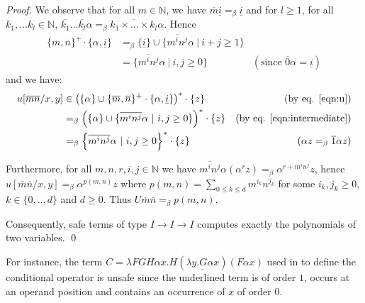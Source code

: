 \documentclass{llncs}
\newcommand{\encode}[1]{\overline{#1}}
\newcommand\union{\cup}
\newcommand\nat{\mathbb{N}}
\begin{document}
\begin{proof}
We observe that for all $m \in \nat$, we have $\encode{m} \underline{i} =_\beta \underline{i}$ and for $l\geq 1$, for all $k_1, \ldots k_l \in \nat$, 
$\encode{k_1}\ldots \encode{k_l} \alpha =_\beta
\encode{k_1\times \ldots \times k_l} \alpha$. Hence
\begin{align}
\{\encode{m},\encode{n}\}^+ \cdot \{\alpha, \underline{i} \} &=_\beta
\{ \underline{i} \} \union
\{ \encode{m^i n^j} \alpha \ |\ i+j \geq 1 \} \nonumber \\
&= \{ \encode{m^i n^j} \alpha \ |\ i,j \geq 0 \} & ( \mbox{since } \encode{0} \alpha = \underline{i}) \label{eqn:intermediate}
\end{align}
and we have:
\begin{align*}
u[\encode{m} \encode{n}/x,y] &\in \left( \{ \alpha \} \union \{\encode{m},\encode{n}\}^+ \cdot \{\alpha, \underline{i} \} \right)^* \cdot \{ z \}  & \mbox{(by eq. \ref{eqn:u})} \\
&=_\beta \left( \{\alpha \} \union \{ \encode{m^i n^j}
\alpha \ | \ i,j \geq 0 \} \right)^* \cdot \{ z \} & \mbox{(by eq. \ref{eqn:intermediate})}  \\
&=_\beta \left\{ \encode{m^i n^j}
\alpha \ | \ i,j \geq 0 \right\}^* \cdot \{ z \} & \mbox{($\alpha z =_\beta \encode{1} \alpha z$)}
\end{align*} 

Furthermore, for all $m,n,r,i,j\in \nat$ 
we have $\encode{m^i n^j} \alpha (\alpha^r z) =_\beta
\alpha^{r + m^i n^j} z$,
hence $u[\encode{m} \encode{n}/x,y] =_\beta \alpha^{p(m,n)} z$ where $p(m,n) = \sum_{0\leq k \leq d} m^{i_k} n^{j_k}$ for some $i_k,j_k \geq 0$, $k \in\{ 0,..,d \}$ and $d\geq 0$.
Thus $U \encode{m} \encode{n} =_\beta \encode{p(m,n)}$. 

Consequently, safe terms of type $I \rightarrow I \rightarrow I$ computes
exactly the polynomials of two variables. \qed
\end{proof}

For instance, the term $ C = \lambda F G H \alpha x . H ( \underline{\lambda y . G \alpha x} ) (F \alpha x)$ used in \cite{citeulike:622637} to define the conditional operator is
unsafe since the underlined term is of order $1$, occurs at an operand position and contains an occurrence of $x$ of order $0$.
\end{document}
